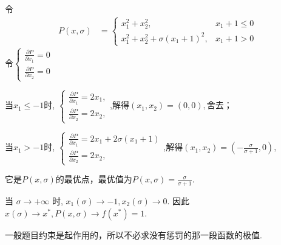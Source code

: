 \documentclass[cn]{elegantbook}
\begin{document}
\begin{solution}
令$$\begin{aligned}
P(x, \sigma)
&=\left\{\begin{array}{ll}
x_{1}^{2}+x_{2}^{2}, & x_{1}+1 \leq 0 \\
x_{1}^{2}+x_{2}^{2}+\sigma\left(x_{1}+1\right)^{2}, & x_{1}+1>0
\end{array}\right.
\end{aligned}$$
令$\begin{cases}
   \frac{\partial P}{\partial x_1}=0 \\
   \frac{\partial P}{\partial x_2}=0
 \end{cases}$

当$x_1\leq -1 $时,
  $\begin{cases}
\frac{\partial P}{\partial x_1}=2x_1,   \\
\frac{\partial P}{\partial x_2}=2x_2,
\end{cases}$,解得$(x_1,x_2)=(0,0),$舍去；

当$x_1>-1$时,
$\begin{cases}
\frac{\partial P}{\partial x_1}=2x_1+2\sigma (x_1+1) \\
\frac{\partial P}{\partial x_2}=2x_2,
\end{cases}$,解得$(x_1,x_2)=(-\frac{\sigma}{\sigma+1},0),$

它是$P(x, \sigma)$的最优点，最优值为$P(x, \sigma)=\frac{\sigma}{\sigma+1}$.

当  $\sigma \rightarrow+\infty$  时,  $x_{1}(\sigma) \rightarrow-1, x_{2}(\sigma) \rightarrow 0 .$
因此 $ x(\sigma) \rightarrow x^{*}, P(x, \sigma) \rightarrow f\left(x^{*}\right)=1 .$

\begin{remark}
一般题目约束是起作用的，所以不必求没有惩罚的那一段函数的极值.
\end{remark}

\end{solution}
\end{document}
